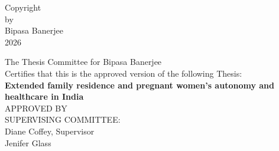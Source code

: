 \documentclass[12pt]{article}
\makeatletter
\renewenvironment{titlepage}
  {%
    \if@twocolumn
      \@restonecoltrue\onecolumn
    \else
      \@restonecolfalse\newpage
    \fi
    \thispagestyle{plain}%
  }%
  {%
    \if@restonecol\twocolumn \else \newpage \fi
  }
\makeatother
\begin{document}


\begin{titlepage}
    \thispagestyle{plain}
    \centering
    \vspace*{\fill}
    
    Copyright\\
    by\\
    Bipasa Banerjee\\
    2026
    
    \vspace*{\fill}
\end{titlepage}


\begin{titlepage}
    \thispagestyle{plain}
    \centering
    
    \vspace*{1.5in}
    
    The Thesis Committee for Bipasa Banerjee\\[1.5em]
    
    Certifies that this is the approved version of the following Thesis:\\[2em]
    
    \textbf{Extended family residence and pregnant women's autonomy and healthcare in India}\\[3em]
    
    APPROVED BY\\[2em]
    
    SUPERVISING COMMITTEE:\\[2em]
    
    Diane Coffey, Supervisor\\[1.5em]
    Jenifer Glass
    
    \vfill
\end{titlepage}
\end{document}
